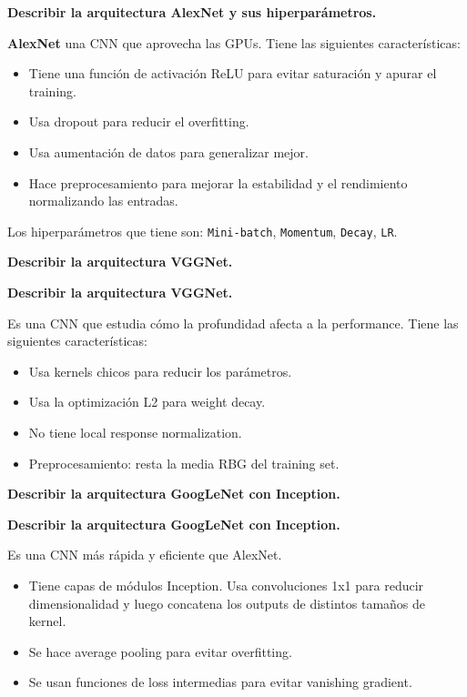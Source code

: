 \documentclass[10pt]{memoir}
\begin{document}
\clearpage
\begin{center}
	\textbf{\Large Describir la arquitectura AlexNet y sus hiperparámetros.}
\end{center}
\noindent \textbf{AlexNet} una CNN que aprovecha las GPUs. Tiene las siguientes características:
\begin{itemize}
	\item Tiene una función de activación ReLU para evitar saturación y apurar el training.
	\item Usa dropout para reducir el overfitting.
	\item Usa aumentación de datos para generalizar mejor.
	\item Hace preprocesamiento para mejorar la estabilidad y el rendimiento normalizando las entradas.
\end{itemize}
\noindent Los hiperparámetros que tiene son: \texttt{Mini-batch}, \texttt{Momentum}, \texttt{Decay}, \texttt{LR}.

\clearpage
\begin{center}
	\textbf{\Large Describir la arquitectura VGGNet.}
\end{center}

\clearpage
\begin{center}
	\textbf{\Large Describir la arquitectura VGGNet.}
\end{center}
\noindent Es una CNN que estudia cómo la profundidad afecta a la performance. Tiene las siguientes características:
\begin{itemize}
	\item Usa kernels chicos para reducir los parámetros.
	\item Usa la optimización L2 para weight decay.
	\item No tiene local response normalization.
	\item Preprocesamiento: resta la media RBG del training set.
\end{itemize}

\clearpage
\begin{center}
	\textbf{\Large Describir la arquitectura GoogLeNet con Inception.}
\end{center}

\clearpage
\begin{center}
	\textbf{\Large Describir la arquitectura GoogLeNet con Inception.}
\end{center}
\noindent Es una CNN más rápida y eficiente que AlexNet.
\begin{itemize}
	\item Tiene capas de módulos Inception. Usa convoluciones 1x1 para reducir dimensionalidad y luego concatena los outputs de distintos tamaños de kernel.
	\item Se hace average pooling para evitar overfitting.
	\item Se usan funciones de loss intermedias para evitar vanishing gradient.
\end{itemize}
\end{document}
